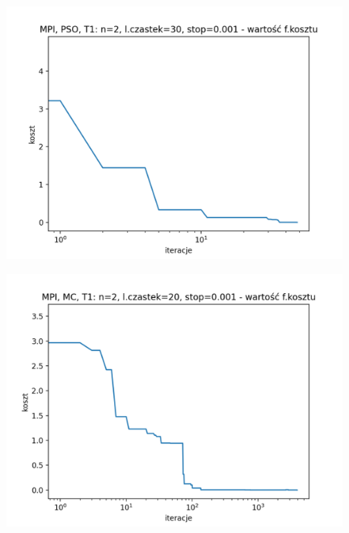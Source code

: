 \documentclass[11pt, a4paper, oneside]{article}
\begin{document}
\begin{figure}[H]
\centering
\begin{minipage}[b]{\dimexpr.5\textwidth-1em}
  \centering
  \includegraphics[width=1\linewidth]{grafiki/MPI_PSO_T1/MPI_PSO_T1_koszt_monotoniczny.png}
  \label{fig:koszt:PSO1}
\end{minipage} \hfill
\begin{minipage}[b]{\dimexpr.5\textwidth-1em}
  \centering
  \includegraphics[width=1\linewidth]{grafiki/MPI_MC_T1/MPI_MC_T1_koszt.png}
  \label{fig:koszt:MC1}
\end{minipage}
\end{figure}
\end{document}
